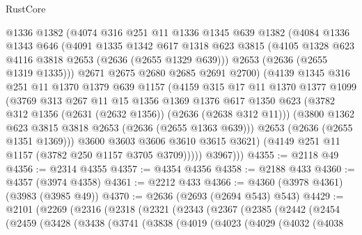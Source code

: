 \begin{lexlean}{RustCore}
\begin{coremodule}
            @1336
            @1382
            (@4074
              @316
              @251
              @11
              @1336
              @1345
              @639
              @1382
              (@4084
                @1336
                @1343
                @646
                (@4091
                  @1335
                  @1342
                  @617
                  @1318
                  @623
                  @3815
                  (@4105 @1328 @623 @4116 @3818 @2653 (@2636 (@2655 @1329 @639)))
                  @2653
                  (@2636 (@2655 @1319 @1335)))
                @2671
                @2675
                @2680
                @2685
                @2691
                @2700)
              (@4139
                @1345
                @316
                @251
                @11
                @1370
                @1379
                @639
                @1157
                (@4159
                  @315
                  @17
                  @11
                  @1370
                  @1377
                  @1099
                  (@3769
                    @313
                    @267
                    @11
                    @15
                    @1356
                    @1369
                    @1376
                    @617
                    @1350
                    @623
                    (@3782 @312 @1356 (@2631 (@2632 @1356)) (@2636 (@2638 @312 @11)))
                    (@3800 @1362 @623 @3815 @3818 @2653 (@2636 (@2655 @1363 @639)))
                    @2653
                    (@2636 (@2655 @1351 @1369)))
                  @3600
                  @3603
                  @3606
                  @3610
                  @3615
                  @3621)
                (@4149 @251 @11 @1157 (@3782 @250 @1157 @3705 @3709)))))
          @3967)))
@4355 := @2118 @49
@4356 := @2314 @4355
@4357 := @4354 @4356
@4358 := @2188 @433
@4360 := @4357 (@3974 @4358)
@4361 := @2212 @433
@4366 := @4360 (@3978 @4361) (@3983 (@3985 @49))
@4370 := @2636 (@2693 (@2694 @543) @543)
@4429 := @2101
    (@2269
      (@2316
        (@2318
          (@2321
            (@2343
              (@2367
                (@2385
                  (@2442
                    (@2454
                      (@2459
                        (@3428
                          (@3438
                            (@3741
                              (@3838
                                (@4019
                                  (@4023
                                    (@4029
                                      (@4032
                                        (@4038

\end{coremodule}
\end{lexlean}
